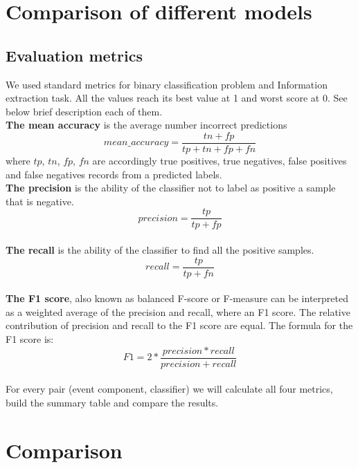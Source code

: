 \section{Comparison of different models}

\subsection{Evaluation metrics}

We used standard metrics for binary classification problem and Information extraction task. All the values reach its best value at 1 and worst score at 0. See below brief description each of them.\\

\noindent\textbf{The mean accuracy} is the average number incorrect predictions 
$$ mean\_accuracy = \frac{tn + fp}{tp + tn + fp + fn}$$
where $tp$, $tn$, $fp$, $fn$ are accordingly true positives, true negatives, false positives and false negatives records from a predicted labels.\\

\noindent\textbf{The precision} is the ability of the classifier not to label as positive a sample that is negative.
$$precision = \frac{tp}{tp + fp}$$ \\

\noindent\textbf{The recall} is the ability of the classifier to find all the positive samples.
$$recall = \frac{tp}{tp + fn}$$ \\

\noindent\textbf{The F1 score}, also known as balanced F-score or F-measure can be interpreted as a weighted average of the precision and recall, where an F1 score. The relative contribution of precision and recall to the F1 score are equal. The formula for the F1 score is:
$$F1 = 2 * \frac{precision * recall}{precision + recall}$$\\

For every pair  (event component, classifier) we will calculate all four metrics, build the summary table and compare the results.

\section{Comparison}

